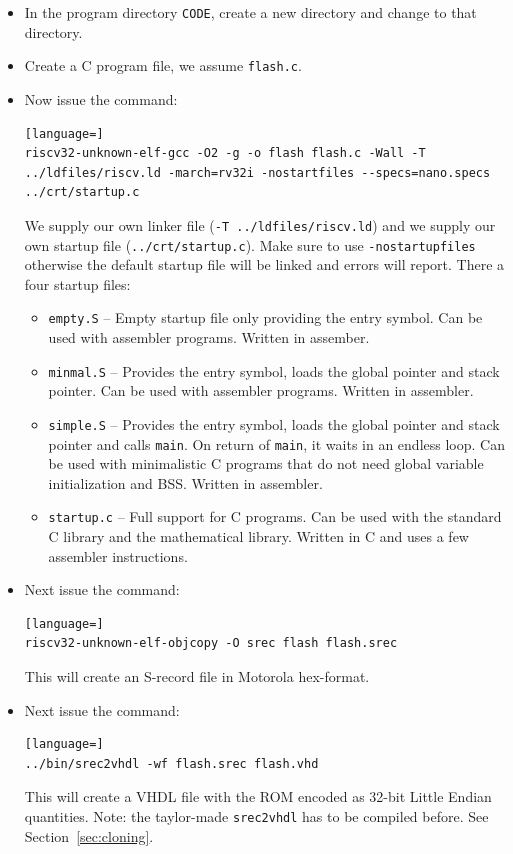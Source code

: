 \documentclass[12pt]{article}
\begin{document}
\begin{itemize}
\item In the program directory \lstinline|CODE|, create a new directory and change to that directory.
\item Create a C program file, we assume \lstinline|flash.c|.
\item Now issue the command:
\begin{lstlisting}[language=]
riscv32-unknown-elf-gcc -O2 -g -o flash flash.c -Wall -T ../ldfiles/riscv.ld -march=rv32i -nostartfiles --specs=nano.specs ../crt/startup.c
\end{lstlisting}
We supply our own linker file (\lstinline|-T ../ldfiles/riscv.ld|) and we supply our own startup file (\lstinline|../crt/startup.c|). Make sure to use \lstinline|-nostartupfiles| otherwise the default startup file will be linked and errors will report. There a four startup files:
\begin{itemize}
\item \lstinline|empty.S| -- Empty startup file only providing the entry symbol. Can be used with assembler programs. Written in assember.
\item \lstinline|minmal.S| -- Provides the entry symbol, loads the global pointer and stack pointer. Can be used with assembler programs. Written in assembler.
\item \lstinline|simple.S| -- Provides the entry symbol, loads the global pointer and stack pointer and calls \lstinline|main|. On return of \lstinline|main|, it waits in an endless loop. Can be used with minimalistic C programs that do not need global variable initialization and BSS. Written in assembler.
\item \lstinline|startup.c| -- Full support for C programs. Can be used with the standard C library and the mathematical library. Written in C and uses a few assembler instructions.
\end{itemize}
\item Next issue the command:
\begin{lstlisting}[language=]
riscv32-unknown-elf-objcopy -O srec flash flash.srec
\end{lstlisting}
This will create an S-record file in Motorola hex-format.
\item Next issue the command:
\begin{lstlisting}[language=]
../bin/srec2vhdl -wf flash.srec flash.vhd
\end{lstlisting}
This will create a VHDL file with the ROM encoded as 32-bit Little Endian quantities. Note: the taylor-made \lstinline|srec2vhdl| has to be compiled before. See Section~\ref{sec:cloning}.

\end{itemize}
\end{document}
